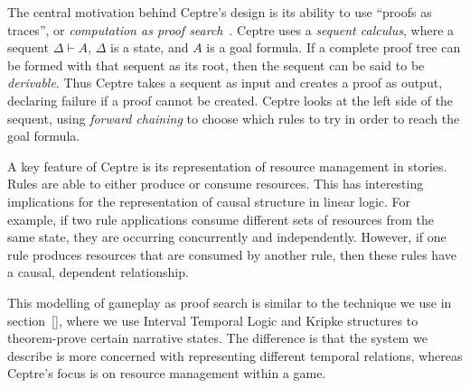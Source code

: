 The central motivation behind Ceptre's design is its ability to use ``proofs as
traces'', or \emph{computation as proof search}~\cite{hodas1991logic}. Ceptre
uses a \emph{sequent calculus}, where a sequent $\Delta \vdash A$, $\Delta$ is a
state, and $A$ is a goal formula. If a complete proof tree can be formed with
that sequent as its root, then the sequent can be said to be \emph{derivable}.
Thus Ceptre takes a sequent as input and creates a proof as output, declaring
failure if a proof cannot be created. Ceptre looks at the left side of the
sequent, using \emph{forward chaining} to choose which rules to try in order to
reach the goal formula.

A key feature of Ceptre is its representation of resource management in stories.
Rules are able to either produce or consume resources. This has interesting
implications for the representation of causal structure in linear logic. For
example, if two rule applications consume different sets of resources from the
same state, they are occurring concurrently and independently. However, if one
rule produces resources that are consumed by another rule, then these rules have
a causal, dependent relationship.

This modelling of gameplay as proof search is similar to the technique we use in
section~\ref{}, where we use Interval Temporal Logic and Kripke structures to
theorem-prove certain narrative states. The difference is that the system we
describe is more concerned with representing different temporal relations,
whereas Ceptre's focus is on resource management within a game.

